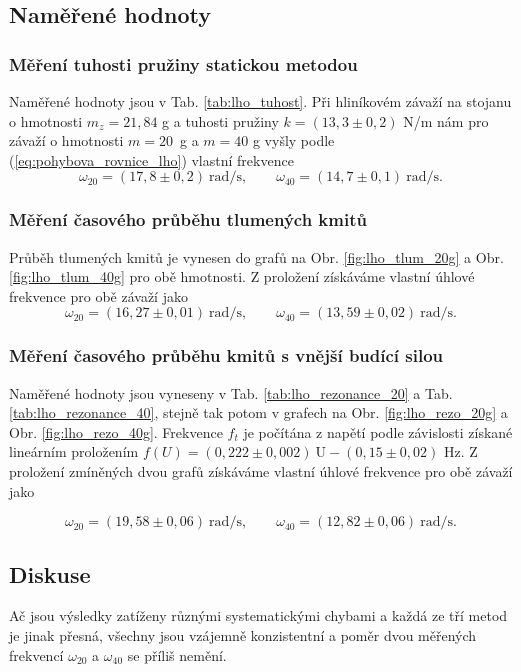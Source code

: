 \documentclass[english]{article}
\newcommand{\unit}[1]{\mathrm{#1}}
\begin{document}
\subsection{Naměřené hodnoty}
	\subsubsection{Měření tuhosti pružiny statickou metodou}
		Naměřené hodnoty jsou v Tab. \ref{tab:lho_tuhost}. Při hliníkovém závaží na stojanu o hmotnosti $m_z = 21,84$ g a tuhosti pružiny $k=(13,3\pm0,2)$ N/m nám pro závaží o hmotnosti $m=20$~g a $m = 40$ g vyšly podle (\ref{eq:pohybova_rovnice_lho}) vlastní frekvence
		\begin{equation}
		\omega_{20} = (17,8\pm0,2)\ \unit{rad/s}, \qquad \omega_{40} = (14,7\pm0,1)\ \unit{rad/s}.
		\end{equation}		
		
	\subsubsection{Měření časového průběhu tlumených kmitů}
		Průběh tlumených kmitů je vynesen do grafů na Obr. \ref{fig:lho_tlum_20g} a Obr. \ref{fig:lho_tlum_40g} pro obě hmotnosti. Z proložení získáváme vlastní úhlové frekvence pro obě závaží jako
		\begin{equation}
		\omega_{20} = (16,27\pm0,01)\ \unit{rad/s}, \qquad \omega_{40} = (13,59\pm0,02)\ \unit{rad/s}.
		\end{equation}		
				
	
	\subsubsection{Měření časového průběhu kmitů s vnější budící silou}
	
		Naměřené hodnoty jsou vyneseny v Tab. \ref{tab:lho_rezonance_20} a Tab. \ref{tab:lho_rezonance_40}, stejně tak potom v grafech na Obr. \ref{fig:lho_rezo_20g} a Obr. \ref{fig:lho_rezo_40g}. Frekvence $f_t$ je počítána z napětí podle závislosti získané lineárním proložením $f(U)=(0,222\pm0,002)\ \unit{U} - (0,15\pm0,02)$ Hz. Z proložení zmíněných dvou grafů získáváme vlastní úhlové frekvence pro obě závaží jako
		
		\begin{equation}
		\omega_{20} = (19,58\pm0,06)\ \unit{rad/s}, \qquad \omega_{40} = (12,82\pm0,06)\ \unit{rad/s}.
		\end{equation}			 
	
\subsection{Diskuse}
	Ač jsou výsledky zatíženy různými systematickými chybami a každá ze tří metod je jinak přesná, všechny jsou vzájemně konzistentní a poměr dvou měřených frekvencí $\omega_{20}$ a $\omega_{40}$ se příliš nemění.
\end{document}
